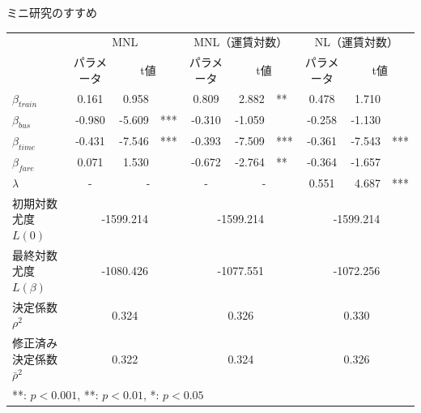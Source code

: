 \begin{column}{ミニ研究のすすめ}
\begin{center}
    \begin{tabular}{l c r@{\,}l c r@{\,}l c r@{\,}l}
    \toprule
       & \multicolumn{3}{c}{MNL} & \multicolumn{3}{c}{MNL（運賃対数）} & \multicolumn{3}{c}{NL（運賃対数）} \\
       & パラメータ & \multicolumn{2}{c}{t値} & パラメータ & \multicolumn{2}{c}{t値} & パラメータ & \multicolumn{2}{c}{t値} \\
    \midrule
    $\beta_{train}$ & 0.161 & 0.958 & & 0.809 & 2.882 & ** & 0.478 & 1.710 & \\
    $\beta_{bus}$   & -0.980 & -5.609 & *** & -0.310 & -1.059 & & -0.258 & -1.130 & \\
    $\beta_{time}$  & -0.431 & -7.546 & *** & -0.393 & -7.509 & *** & -0.361 & -7.543 & *** \\
    $\beta_{fare}$  & 0.071 & 1.530 & & -0.672 & -2.764 & ** & -0.364 & -1.657 & \\
    $\lambda$       & - & \multicolumn{2}{c}{-} & - & \multicolumn{2}{c}{-} & 0.551 & 4.687 & *** \\
    \midrule
    初期対数尤度 $L(0)$ & \multicolumn{3}{c}{-1599.214} & \multicolumn{3}{c}{-1599.214} & \multicolumn{3}{c}{-1599.214} \\
    最終対数尤度 $L(\beta)$ & \multicolumn{3}{c}{-1080.426} & \multicolumn{3}{c}{-1077.551} & \multicolumn{3}{c}{-1072.256} \\
    決定係数 $\rho^2$ & \multicolumn{3}{c}{0.324} & \multicolumn{3}{c}{0.326} & \multicolumn{3}{c}{0.330} \\
    修正済み決定係数 $\bar{\rho}^2$ & \multicolumn{3}{c}{0.322} & \multicolumn{3}{c}{0.324} & \multicolumn{3}{c}{0.326} \\
    \bottomrule
    \multicolumn{10}{l}{\footnotesize ***: $p < 0.001$, **: $p < 0.01$, *: $p < 0.05$} \\
    \end{tabular}
\end{center}

\end{column}
\clearpage